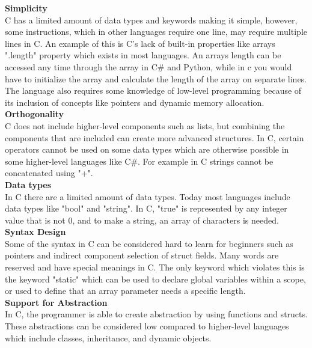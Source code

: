 \noindent\textbf{Simplicity}\\
\noindent C has a limited amount of data types and keywords making it simple, however, some instructions, which in other languages require one line, may require multiple lines in C. An example of this is C's lack of built-in properties like arrays ".length" property which exists in most languages. An arrays length can be accessed any time through the array in C\# and Python, while in c you would have to initialize the array and calculate the length of the array on separate lines. The language also requires some knowledge of low-level programming because of its inclusion of concepts like pointers and dynamic memory allocation. \\

\noindent\textbf{Orthogonality}\\
\noindent C does not include higher-level components such as lists, but combining the components that are included can create more advanced structures. In C, certain operators cannot be used on some data types which are otherwise possible in some higher-level languages like C\#. For example in C strings cannot be concatenated using "+".\\

\noindent\textbf{Data types}\\
\noindent In C there are a limited amount of data types. Today most languages include data types like "bool" and "string". In C, "true" is represented by any integer value that is not 0, and to make a string, an array of characters is needed. \\

\noindent\textbf{Syntax Design}\\
\noindent Some of the syntax in C can be considered hard to learn for beginners such as pointers and indirect component selection of struct fields. Many words are reserved and have special meanings in C. The only keyword which violates this is the keyword "static" which can be used to declare global variables within a scope, or used to define that an array parameter needs a specific length.\\

\noindent\textbf{Support for Abstraction}\\
\noindent In C, the programmer is able to create abstraction by using functions and structs. These abstractions can be considered low compared to higher-level languages which include classes, inheritance, and dynamic objects.\\

